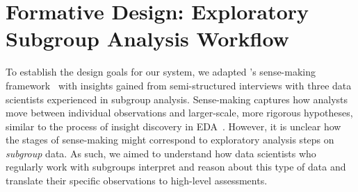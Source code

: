 \section{Formative Design: Exploratory Subgroup Analysis Workflow}
\label{sec:formative}

To establish the design goals for our system, we adapted \citeauthor{pirolli_sensemaking_2005}'s sense-making framework~\cite{pirolli_sensemaking_2005} with insights gained from semi-structured interviews with three data scientists experienced in subgroup analysis.
Sense-making captures how analysts move between individual observations and larger-scale, more rigorous hypotheses, similar to the process of insight discovery in EDA~\cite{tukey_exploratory_1970,cabrera_what_2022}. 
However, it is unclear how the stages of sense-making might correspond to exploratory analysis steps on \textit{subgroup} data.
As such, we aimed to understand how data scientists who regularly work with subgroups interpret and reason about this type of data and translate their specific observations to high-level assessments.


